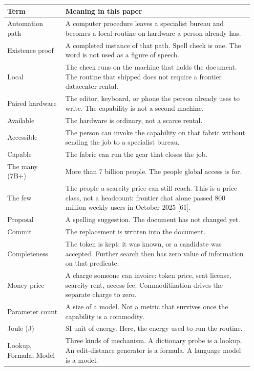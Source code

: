 \documentclass[
  10pt,
]{article}
\newcounter{none} %
\begin{document}
{\def\LTcaptype{none} %
\begin{longtable}[]{@{}
  >{\raggedright\arraybackslash}p{}
  >{\raggedright\arraybackslash}p{}@{}}
\toprule\noalign{}
\begin{minipage}[b]{\linewidth}\raggedright
Term
\end{minipage} & \begin{minipage}[b]{\linewidth}\raggedright
Meaning in this paper
\end{minipage} \\
\midrule\noalign{}
\endhead
\bottomrule\noalign{}
\endlastfoot
Automation path & A computer procedure leaves a specialist bureau and
becomes a local routine on hardware a person already has. \\
Existence proof & A completed instance of that path. Spell check is one.
The word is not used as a figure of speech. \\
Local & The check runs on the machine that holds the document. The
routine that shipped does not require a frontier datacenter rental. \\
Paired hardware & The editor, keyboard, or phone the person already uses
to write. The capability is not a second machine. \\
Available & The hardware is ordinary, not a scarce rental. \\
Accessible & The person can invoke the capability on that fabric without
sending the job to a specialist bureau. \\
Capable & The fabric can run the gear that closes the job. \\
The many (7B+) & More than 7 billion people. The people global access is
for. \\
The few & The people a scarcity price can still reach. This is a price
class, not a headcount: frontier chat alone passed 800 million weekly
users in October 2025 {[}61{]}. \\
Proposal & A spelling suggestion. The document has not changed yet. \\
Commit & The replacement is written into the document. \\
Completeness & The token is kept: it was known, or a candidate was
accepted. Further search then has zero value of information on that
predicate. \\
Money price & A charge someone can invoice: token price, seat license,
scarcity rent, access fee. Commoditization drives the separate charge to
zero. \\
Parameter count & A size of a model. Not a metric that survives once the
capability is a commodity. \\
Joule (J) & SI unit of energy. Here, the energy used to run the
routine. \\
Lookup, Formula, Model & Three kinds of mechanism. A dictionary probe is
a lookup. An edit-distance generator is a formula. A language model is a
model. \\
\end{longtable}
}
\end{document}
